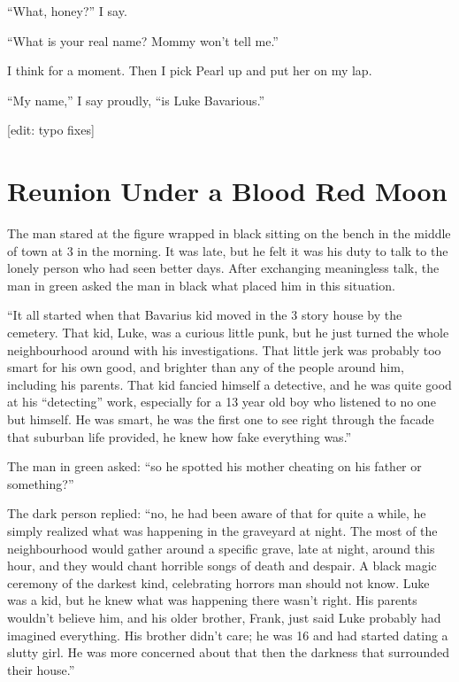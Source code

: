 ``What, honey?'' I say.



``What is your real name? Mommy won't tell
me.''



I think for a moment. Then I pick Pearl up and put her on my
lap.



``My name,'' I say proudly, ``is Luke
Bavarious.''



[edit: typo fixes] 
 



\chapter{Reunion Under a Blood Red Moon}



The man stared at the figure wrapped in black sitting on the bench
in the middle of town at 3 in the morning. It was late, but he felt
it was his duty to talk to the lonely person who had seen better
days. After exchanging meaningless talk, the man in green asked the
man in black what placed him in this situation.

``It all started when that Bavarius kid moved in the 3 story
house by the cemetery. That kid, Luke, was a curious little punk,
but he just turned the whole neighbourhood around with his
investigations. That little jerk was probably too smart for his own
good, and brighter than any of the people around him, including his
parents. That kid fancied himself a detective, and he was quite
good at his ``detecting'' work, especially for a 13 year
old boy who listened to no one but himself. He was smart, he was
the first one to see right through the facade that suburban life
provided, he knew how fake everything was.''

The man in green asked: ``so he spotted his mother cheating on
his father or something?''

The dark person replied: ``no, he had been aware of that for
quite a while, he simply realized what was happening in the
graveyard at night. The most of the neighbourhood would gather
around a specific grave, late at night, around this hour, and they
would chant horrible songs of death and despair. A black magic
ceremony of the darkest kind, celebrating horrors man should not
know. Luke was a kid, but he knew what was happening there
wasn't right. His parents wouldn't believe him, and his
older brother, Frank, just said Luke probably had imagined
everything. His brother didn't care; he was 16 and had
started dating a slutty girl. He was more concerned about that then
the darkness that surrounded their house.''

